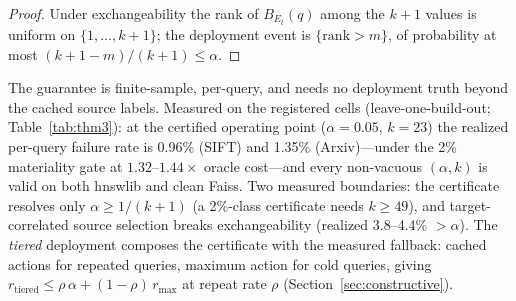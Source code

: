 \documentclass{article}
\begin{document}
\begin{proof}
Under exchangeability the rank of $B_{E_t}(q)$ among the $k{+}1$ values is uniform on
$\{1,\dots,k{+}1\}$; the deployment event is $\{\mathrm{rank}>m\}$, of probability at most
$(k{+}1-m)/(k{+}1)\le\alpha$.
\end{proof}

The guarantee is finite-sample, per-query, and needs no deployment truth beyond the cached source labels.
Measured on the registered cells (leave-one-build-out; Table~\ref{tab:thm3}): at the certified operating
point ($\alpha{=}0.05$, $k{=}23$) the realized per-query failure rate is 0.96\% (SIFT) and 1.35\%
(Arxiv)---under the 2\% materiality gate at $1.32$--$1.44\times$ oracle cost---and every non-vacuous
$(\alpha,k)$ is valid on both hnswlib and clean Faiss. Two measured boundaries: the certificate resolves
only $\alpha\ge 1/(k+1)$ (a 2\%-class certificate needs $k\ge 49$), and target-correlated source selection
breaks exchangeability (realized 3.8--4.4\% $>\alpha$). The \emph{tiered} deployment composes the
certificate with the measured fallback: cached actions for repeated queries, maximum action for cold
queries, giving $r_{\mathrm{tiered}}\le\rho\,\alpha+(1-\rho)\,r_{\max}$ at repeat rate $\rho$
(Section~\ref{sec:constructive}).
\end{document}
